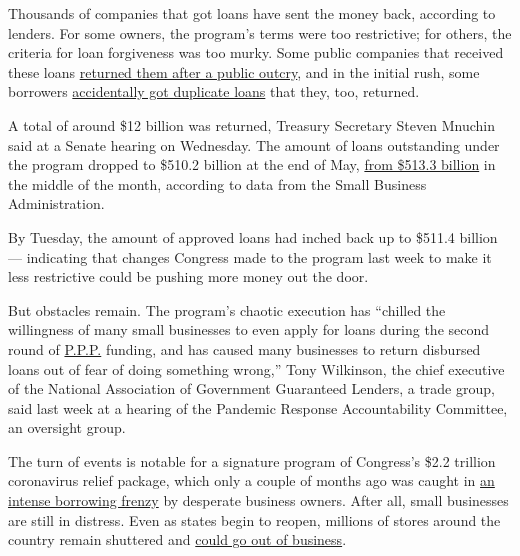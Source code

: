 Thousands of companies that got loans have sent the money back,
according to lenders. For some owners, the program's terms were too
restrictive; for others, the criteria for loan forgiveness was too
murky. Some public companies that received these loans
\href{https://www.nytimes.com/2020/05/18/business/ppp-deadline-return-funds-coronavirus.html}{returned
them after a public outcry}, and in the initial rush, some borrowers
\href{https://www.reuters.com/article/us-health-coronavirus-usa-ppp-exclusive/exclusive-us-small-business-program-handed-out-virus-aid-to-many-borrowers-twice-idUSKBN2391S9}{accidentally
got duplicate loans} that they, too, returned.

A total of around \$12 billion was returned, Treasury Secretary Steven
Mnuchin said at a Senate hearing on Wednesday. The amount of loans
outstanding under the program dropped to \$510.2 billion at the end of
May,
\href{https://content.sba.gov/sites/default/files/2020-05/PPP_Report_Net_200518_0.pdf}{from
\$513.3 billion} in the middle of the month, according to data from the
Small Business Administration.

By Tuesday, the amount of approved loans had inched back up to \$511.4
billion --- indicating that changes Congress made to the program last
week to make it less restrictive could be pushing more money out the
door.

But obstacles remain. The program's chaotic execution has ``chilled the
willingness of many small businesses to even apply for loans during the
second round of
\href{https://www.nytimes.com/2020/06/30/business/paycheck-protection-program-coronavirus.html}{P.P.P.}
funding, and has caused many businesses to return disbursed loans out of
fear of doing something wrong,'' Tony Wilkinson, the chief executive of
the National Association of Government Guaranteed Lenders, a trade
group, said last week at a hearing of the Pandemic Response
Accountability Committee, an oversight group.

The turn of events is notable for a signature program of Congress's
\$2.2 trillion coronavirus relief package, which only a couple of months
ago was caught in
\href{https://www.nytimes.com/2020/04/16/business/coronavirus-sba-loans-out-of-money.html}{an
intense borrowing frenzy} by desperate business owners. After all, small
businesses are still in distress. Even as states begin to reopen,
millions of stores around the country remain shuttered and
\href{https://www.nytimes.com/article/small-business-bankruptcy-coronavirus.html}{could
go out of business}.


